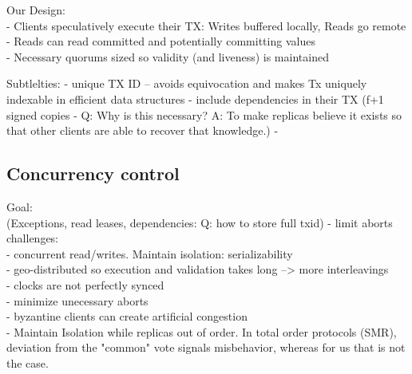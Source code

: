 Our Design:\\
- Clients speculatively execute their TX: Writes buffered locally, Reads go remote\\
- Reads can read committed and potentially committing values\\
- Necessary quorums sized so validity (and liveness) is maintained

Subtlelties:
- unique TX ID -- avoids equivocation and makes Tx uniquely indexable in efficient data structures
- include dependencies in their TX (f+1 signed copies - Q: Why is this necessary? A: To make replicas believe it exists so that other clients are able to recover that knowledge.)
- 

\subsection{Concurrency control}
Goal: \\(Exceptions, read leases, dependencies: Q: how to store full txid)
- limit aborts\\

challenges:\\
- concurrent read/writes. Maintain isolation: serializability\\
- geo-distributed so execution and validation takes long --> more interleavings\\
- clocks are not perfectly synced\\
- minimize unecessary aborts\\
- byzantine clients can create artificial congestion\\

- Maintain Isolation while replicas out of order. In total order protocols (SMR), deviation from the "common" vote signals misbehavior, whereas for us that is not the case. \\

